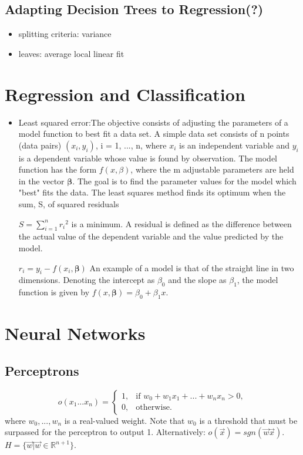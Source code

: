 \documentclass[11pt]{article}
\begin{document}
\subsection{Adapting Decision Trees to Regression(?)}
\begin{itemize}
\item splitting criteria: variance
\item leaves: average local linear fit
\end{itemize}

\section{Regression and Classification}
\begin{itemize}
\item Least squared error:The objective consists of adjusting the parameters of a model function to best fit a data set. A simple data set consists of n points (data pairs) $(x_i,y_i)$, i = 1, ..., n, where $x_i$ is an independent variable and $y_i$ is a dependent variable whose value is found by observation. The model function has the form $f(x,\beta)$, where the m adjustable parameters are held in the vector $\boldsymbol \beta$. The goal is to find the parameter values for the model which "best" fits the data. The least squares method finds its optimum when the sum, S, of squared residuals

$S=\sum_{i=1}^{n}{r_i}^2$
is a minimum. A residual is defined as the difference between the actual value of the dependent variable and the value predicted by the model.

$r_i=y_i-f(x_i,\boldsymbol \beta)$
An example of a model is that of the straight line in two dimensions. Denoting the intercept as $\beta_0$ and the slope as $\beta_1$, the model function is given by $f(x,\boldsymbol \beta)=\beta_0+\beta_1 x$.
\end{itemize}

\section{Neural Networks}
\subsection{Perceptrons}
$$o(x_1...x_n) =
    \begin{cases}
            1, &         \text{if } w_0+w_1x_1+...+w_nx_n>0,\\
            0, &         \text{otherwise}.
    \end{cases}
$$
where $w_0,...,w_n$ is a real-valued weight. Note that $w_0$ is a threshold that must be surpassed for the perceptron to output 1. Alternatively: $o(\vec{x}) = sgn(\vec{w}\vec{x})$. $H =\{\vec{w} | \vec{w} \in \mathbb{R}^{n+1} \}$.
\end{document}
